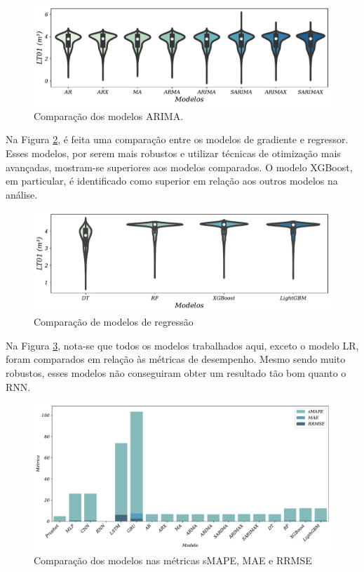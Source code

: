 \begin{figure}[!htb]
	\centering
	\caption{Comparação dos modelos ARIMA.}\label{fig:modelos-arima}
	\includegraphics[width=\linewidth]{Resultados/Figuras/modelos-arima}
	
	
\end{figure}

Na Figura \ref{fig:violin-lr-xgb-lgbm-rf}, é feita uma comparação entre os modelos de gradiente e regressor. Esses modelos, por serem mais robustos e utilizar técnicas de otimização mais avançadas, mostram-se superiores aos modelos comparados. O modelo XGBoost, em particular, é identificado como superior em relação aos outros modelos na análise.

\begin{figure}[!htb]
	\centering
	\caption{Comparação de modelos de regressão}\label{fig:violin-lr-xgb-lgbm-rf}
	\includegraphics[width=\linewidth]{Resultados/Figuras/violin-LR-XGB-LGBM-RF}
	
\end{figure}

Na Figura \ref{fig:basic_comparar}, nota-se que todos os modelos trabalhados aqui, exceto o modelo LR, foram comparados em relação às métricas de desempenho. Mesmo sendo muito robustos, esses modelos não conseguiram obter um resultado tão bom quanto o RNN.


\begin{figure}[!htb]
	\centering
	\caption{Comparação dos modelos nas métricas sMAPE, MAE e RRMSE\label{fig:basic_comparar}}
	\includegraphics[width=\linewidth]{Resultados/Figuras/metricas_comparacao_modelos}
\end{figure}



